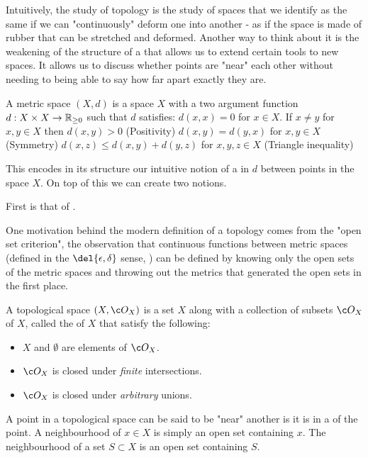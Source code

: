 Intuitively, the study of topology is the study of spaces that we identify as the same if we can "continuously" deform one into another - as if the space is made of rubber that can be stretched and deformed.
Another way to think about it is the weakening of the structure of a  that allows us to extend certain tools to new spaces.
It allows us to discuss whether points are "near" each other without needing to being able to say how far apart exactly they are.

\begin{definition}
	A metric space \((X, d)\) is a space \(X\) with a two argument function \(d: X\times X \to \mathbb{R}_{\geq 0}\) such that \(d\) satisfies:
	\1 \(d(x, x) = 0\) for \(x\in X\).
	\2 If \(x \neq y\) for \(x, y\in X\) then \(d(x, y) > 0\) (Positivity)
	\3 \(d(x, y) = d(y, x)\) for \(x, y \in X\) (Symmetry)
	\4 \(d(x, z) \leq d(x, y) + d(y, z)\) for \(x, y, z \in X\) (Triangle inequality)
	\0
\end{definition}
This encodes in its structure our intuitive notion of a  in \(d\) between points in the space \(X\).
On top of this we can create two notions.

First is that of . 


One motivation behind the modern definition of a topology comes from the "open set criterion", the observation that continuous functions between metric spaces (defined in the \(\del{\epsilon, \delta}\) sense, \textcite[chapter 9]{tao2022analysisI}) can be defined by knowing only the open sets of the metric spaces and throwing out the metrics that generated the open sets in the first place.
\begin{definition}[Topology]
	A topological space \((X, \topo{X})\) is a set \(X\) along with a collection of subsets \(\topo{X}\) of \(X\), called the  of \(X\) that satisfy the following:
	\begin{itemize}
		\item \(X\) and \(\emptyset\) are elements of \(\topo{X}\).
		\item \(\topo{X}\) is closed under \emph{finite} intersections.
		\item \(\topo{X}\) is closed under \emph{arbitrary} unions.
	\end{itemize}
\end{definition}
A point in a topological space can be said to be "near" another is it is in a  of the point.
A neighbourhood of \(x \in X\) is simply an open set containing \(x\).
The neighbourhood of a set \(S\subset X\) is an open set containing \(S\).


